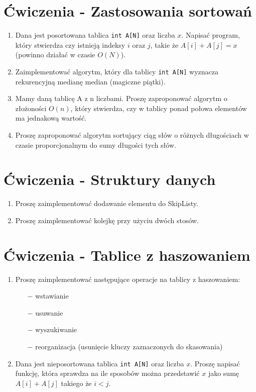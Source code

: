 \documentclass[11pt]{article}
\begin{document}
\newpage
\section{Ćwiczenia - Zastosowania sortowań}

\begin{enumerate}
	\item Dana jest posortowana tablica \texttt{int A[N]} oraz liczba $x$.
	Napisać program, który stwierdza czy istnieją indeksy $i$ oraz $j$,
	takie że $A[i]+A[j]=x$ (powinno działać w czasie $O(N)$).
	
	\item Zaimplementować algorytm, który dla tablicy \texttt{int A[N]} wyznacza
	rekurencyjną medianę median (magiczne piątki).
	
	\item Mamy daną tablicę A z n liczbami. Proszę zaproponować algorytm
	o złożoności $O(n)$, który stwierdza, czy w tablicy ponad połowa elementów
	ma jednakową wartość.
	
	\item Proszę zaproponować algorytm sortujący ciąg słów o różnych długościach
	w czasie proporcjonalnym do sumy długości tych słów.
\end{enumerate}

\section{Ćwiczenia - Struktury danych}

\begin{enumerate}
	\item Proszę zaimplementować dodawanie elementu do SkipListy.
	
	\item Proszę zaimplementować kolejkę przy użyciu dwóch stosów.
	
	
\end{enumerate}

\section{Ćwiczenia - Tablice z haszowaniem}

\begin{enumerate}
	
	\item Proszę zaimplementować następujące operacje na tablicy z haszowaniem:
	\begin{itemize}
		\item[$-$] wstawianie
		\item[$-$] usuwanie
		\item[$-$] wyszukiwanie
		\item[$-$] reorganizacja (usunięcie kluczy zaznaczonych do skasowania)
	\end{itemize}
	
	\item Dana jest nieposortowana tablica \texttt{int A[N]} oraz liczba $x$.
	Proszę napisać funkcję, która sprawdza na ile sposobów można przedstawić
	$x$ jako sumę $A[i]+A[j]$ takiego że $i<j$.
		
\end{enumerate}
\end{document}
